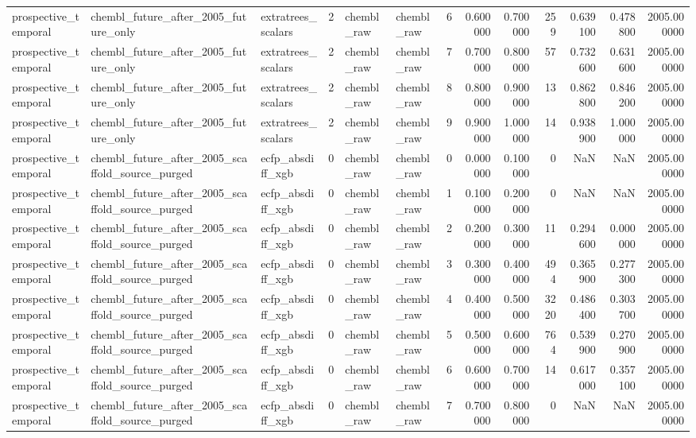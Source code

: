 \begin{longtable}{lllrllrrrrrrr}
prospective\_temporal & chembl\_future\_after\_2005\_future\_only & extratrees\_scalars & 2 & chembl\_raw & chembl\_raw & 6 & 0.600000 & 0.700000 & 259 & 0.639100 & 0.478800 & 2005.000000 \\
prospective\_temporal & chembl\_future\_after\_2005\_future\_only & extratrees\_scalars & 2 & chembl\_raw & chembl\_raw & 7 & 0.700000 & 0.800000 & 57 & 0.732600 & 0.631600 & 2005.000000 \\
prospective\_temporal & chembl\_future\_after\_2005\_future\_only & extratrees\_scalars & 2 & chembl\_raw & chembl\_raw & 8 & 0.800000 & 0.900000 & 13 & 0.862800 & 0.846200 & 2005.000000 \\
prospective\_temporal & chembl\_future\_after\_2005\_future\_only & extratrees\_scalars & 2 & chembl\_raw & chembl\_raw & 9 & 0.900000 & 1.000000 & 14 & 0.938900 & 1.000000 & 2005.000000 \\
prospective\_temporal & chembl\_future\_after\_2005\_scaffold\_source\_purged & ecfp\_absdiff\_xgb & 0 & chembl\_raw & chembl\_raw & 0 & 0.000000 & 0.100000 & 0 & NaN & NaN & 2005.000000 \\
prospective\_temporal & chembl\_future\_after\_2005\_scaffold\_source\_purged & ecfp\_absdiff\_xgb & 0 & chembl\_raw & chembl\_raw & 1 & 0.100000 & 0.200000 & 0 & NaN & NaN & 2005.000000 \\
prospective\_temporal & chembl\_future\_after\_2005\_scaffold\_source\_purged & ecfp\_absdiff\_xgb & 0 & chembl\_raw & chembl\_raw & 2 & 0.200000 & 0.300000 & 11 & 0.294600 & 0.000000 & 2005.000000 \\
prospective\_temporal & chembl\_future\_after\_2005\_scaffold\_source\_purged & ecfp\_absdiff\_xgb & 0 & chembl\_raw & chembl\_raw & 3 & 0.300000 & 0.400000 & 494 & 0.365900 & 0.277300 & 2005.000000 \\
prospective\_temporal & chembl\_future\_after\_2005\_scaffold\_source\_purged & ecfp\_absdiff\_xgb & 0 & chembl\_raw & chembl\_raw & 4 & 0.400000 & 0.500000 & 3220 & 0.486400 & 0.303700 & 2005.000000 \\
prospective\_temporal & chembl\_future\_after\_2005\_scaffold\_source\_purged & ecfp\_absdiff\_xgb & 0 & chembl\_raw & chembl\_raw & 5 & 0.500000 & 0.600000 & 764 & 0.539900 & 0.270900 & 2005.000000 \\
prospective\_temporal & chembl\_future\_after\_2005\_scaffold\_source\_purged & ecfp\_absdiff\_xgb & 0 & chembl\_raw & chembl\_raw & 6 & 0.600000 & 0.700000 & 14 & 0.617000 & 0.357100 & 2005.000000 \\
prospective\_temporal & chembl\_future\_after\_2005\_scaffold\_source\_purged & ecfp\_absdiff\_xgb & 0 & chembl\_raw & chembl\_raw & 7 & 0.700000 & 0.800000 & 0 & NaN & NaN & 2005.000000 \\

\end{longtable}
